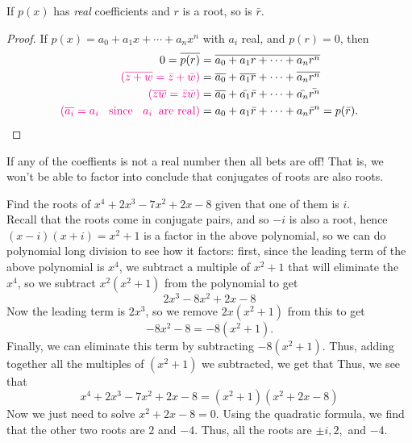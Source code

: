 \documentclass[11pt,dvipsnames]{book}
\numberwithin{equation}{section} %
\numberwithin{figure}{section} %
\numberwithin{table}{section} %
\begin{document}
\begin{theorem} If $p(x)$ has {\it real} coefficients and $r$ is a root, so is $\bar{r}$. 
\end{theorem}

\begin{proof}
If $p(x)=a_0+a_{1}x+\cdots +a_{n}x^n$ with $a_{i}$ real, and $p(r)=0$, then
\begin{align*}
0 =\overline{p(r)}
 & =\overline{a_0+a_{1}r+\cdots +a_{n}r^n} \\
{\color{magenta} (\overline{z+w}=\bar{z}+\bar{w})} & = \overline{a_0}+\overline{a_1 r}+\cdots + \overline{ a_n r^n} \\ 
{\color{magenta} (\overline{zw}=\bar{z}\bar{w})} & =\overline{a_0}+\bar{a_1} \bar{ r}+\cdots + \bar{ a_n}\bar{ r^n} \\ 
{\color{magenta} (\overline{a_{i}}=a_{i}\;\; \mbox{ since }\;\;a_{i} \;\; \mbox{are real})} &  ={a_0}+{a_1} \bar{ r}+\cdots + { a_n}\bar{ r}^n = p(\bar{r}).
\end{align*}
 
\end{proof}
 



 If any of the coeffients is not a real number then all bets are off! That is, we won't be able to factor into conclude that conjugates of roots are also roots. \\




\begin{example}
Find the roots of $x^4+2x^3-7x^2+2x-8$ given that one of them is $i$. \\


Recall that the roots come in conjugate pairs, and so $-i$ is also a root, hence $(x-i)(x+i)=x^2+1$ is a factor in the above polynomial, so we can do polynomial long division to see how it factors: first, since the leading term of the above polynomial is $x^4$, we subtract a multiple of $x^2+1$ that will eliminate the $x^4$, so we subtract $x^2(x^2+1)$ from the polynomial to get
\[
2x^3-8x^2+2x-8\]
Now the leading term is $2x^3$, so we remove $2x(x^2+1)$ from this to get
\[
-8x^2-8=-8(x^2+1).
\]
Finally, we can eliminate this term by subtracting $-8(x^2+1)$. Thus, adding together all the multiples of $(x^2+1)$ we subtracted, we get that
Thus, we see that 
\[
x^4+2x^3-7x^2+2x-8=(x^2+1)(x^2+2x-8)
\]
Now we just need to solve $x^2+2x-8=0$. Using the quadratic formula, we find that the other two roots are $2$ and $-4$. Thus, all the roots are $\pm i, 2,$ and $-4$. 
\end{example}
\end{document}

